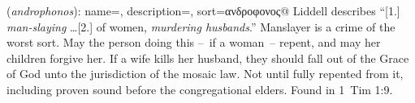 \item[Husband-murderer,]

(\textit{androphonos}):
{
    name=,
    description={},
    sort=ανδροφονος@
}
Liddell describes ``[1.] \emph{man-slaying} \ldots [2.] of women, \emph{murdering husbands}.'' Manslayer is a crime of the worst sort. May the person doing this --~if a woman~-- repent, and may her children forgive her. If a wife kills her husband, they should fall out of the Grace of God unto the jurisdiction of the mosaic law. Not until fully repented from it, including proven sound before the congregational elders.
Found in 1~Tim 1:9.
